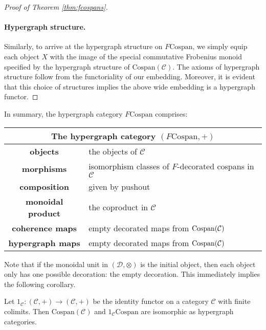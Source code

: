 \begin{proof}[Proof of Theorem \ref{thm:fcospans}]
\paragraph{Hypergraph structure.}
Similarly, to arrive at the hypergraph structure on \linebreak
$F\mathrm{Cospan}$, we simply equip each object $X$ with the image of the
special commutative Frobenius monoid specified by the hypergraph structure of
$\mathrm{Cospan(\mathcal{C})}$. The axioms of hypergraph structure follow from
the functoriality of our embedding. Moreover, it is evident that this choice of
structures implies the above wide embedding is a hypergraph functor.
\end{proof}

In summary, the hypergraph category $F\mathrm{Cospan}$ comprises:
\smallskip

\begin{center}
  \begin{tabular}{| c | p{} |}
    \hline
    \multicolumn{2}{|c|}{The hypergraph category $(F\mathrm{Cospan},+)$} \\
    \hline
    \textbf{objects} & the objects of $\mathcal C$ \\ 
    \textbf{morphisms} & isomorphism classes of $F$-decorated cospans in
    $\mathcal C$\\ 
    \textbf{composition} & given by pushout \\
    \textbf{monoidal product} & the coproduct in $\mathcal C$ \\
    \textbf{coherence maps} & empty decorated maps from $\operatorname{{Cospan}}(\mathcal C)$ \\
    \textbf{hypergraph maps} & empty decorated maps from $\operatorname{{Cospan}}(\mathcal C)$ \\
    \hline
  \end{tabular}
\end{center}
\smallskip

Note that if the monoidal unit in $(\mathcal D,\otimes)$ is the initial object,
then each object only has one possible decoration: the empty decoration. This
immediately implies the following corollary.
\begin{corollary}
  Let $1_{\mathcal C}\colon (\mathcal C,+) \to (\mathcal C,+)$ be the identity functor
  on a category $\mathcal C$ with finite colimits. Then
  $\mathrm{Cospan}(\mathcal C)$ and $1_{\mathcal C}\mathrm{Cospan}$ are
  isomorphic as hypergraph categories.
\end{corollary}

